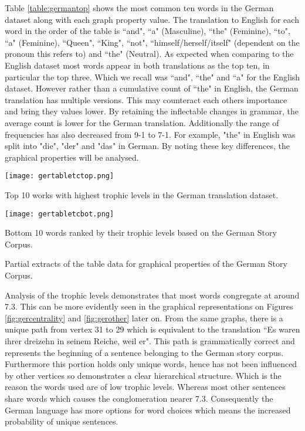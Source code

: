 Table \ref{table:germantop} shows the most common ten words in the German dataset along with each graph property value. The translation to English for each word in the order of the table is ``and", ``a" (Masculine), ``the" (Feminine), ``to", ``a" (Feminine), ``Queen", ``King", ``not", ``himself/herself/itself" (dependent on the pronoun this refers to) and ``the" (Neutral). As expected when comparing to the English dataset most words appear in both translations as the top ten, in particular the top three. Which we recall was ``and", ``the" and ``a" for the English dataset. However rather than a cumulative count of ``the" in English, the German translation has multiple versions. This may counteract each others importance and bring they values lower. By retaining the inflectable changes in grammar, the average count is lower for the German translation. Additionally the range of frequencies has also decreased from 9-1 to 7-1. For example, "the" in English was split into "die", "der" and "das" in German. By noting these key differences, the graphical properties will be analysed.

\begin{table}[H]
\centering
\begin{subtable}{.45\textwidth}
	\centering
	\texttt{[image: gertabletctop.png]}
	\caption{Top 10 works with highest trophic levels in the German translation dataset.}
	\label{table:germantoptc}
\end{subtable}
\hfill
\begin{subtable}{.45\textwidth}
	\centering
	\texttt{[image: gertabletcbot.png]}
	\caption{Bottom 10 words ranked by their trophic levels based on the German Story Corpus.}
	\label{table:germanbottc}
\end{subtable}
\caption{Partial extracts of the table data for graphical properties of the German Story Corpus.}
\end{table}

Analysis of the trophic levels demonstrates that most words congregate at around 7.3. This can be more evidently seen in the graphical representations on Figures \ref{fig:gercentrality} and \ref{fig:gerother} later on. From the same graphs, there is a unique path from vertex 31 to 29 which is equivalent to the translation ``Es waren ihrer dreizehn in seinem Reiche, weil er". This path is grammatically correct and represents the beginning of a sentence belonging to the German story corpus. Furthermore this portion holds only unique words, hence has not been influenced by other vertices so demonstrates a clear hierarchical structure. Which is the reason the words used are of low trophic levels. Whereas most other sentences share words which causes the conglomeration nearer 7.3. Consequently the German language has more options for word choices which means the increased probability of unique sentences.

